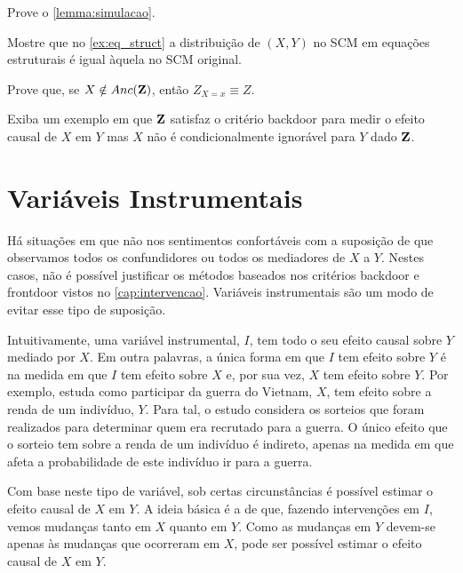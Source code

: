 \begin{exercise}
 Prove o \cref{lemma:simulacao}.
\end{exercise}

\begin{exercise}
 Mostre que no \cref{ex:eq_struct} 
 a distribuição de $(X,Y)$ no SCM 
 em equações estruturais é igual 
 àquela no SCM original.
\end{exercise}

\begin{exercise}
 \label{ex:pom_anc}
 Prove que, se $X \notin Anc({\mathbf{Z}})$, então
 $Z_{X=x} \equiv Z$.
\end{exercise}

\begin{exercise}
 Exiba um exemplo em que
 ${\mathbf{Z}}$ satisfaz o critério backdoor para
 medir o efeito causal de $X$ em $Y$ mas
 $X$ não é condicionalmente ignorável para $Y$ dado ${\mathbf{Z}}$.
\end{exercise}

\section{Variáveis Instrumentais}
\label{sec:instrument}

Há situações em que 
não nos sentimentos confortáveis com
a suposição de que observamos
todos os confundidores ou
todos os mediadores de $X$ a $Y$.
Nestes casos, não é possível
justificar os métodos baseados
nos critérios backdoor e frontdoor
vistos no \cref{cap:intervencao}.
Variáveis instrumentais são 
um modo de evitar esse tipo de suposição.

Intuitivamente, uma variável instrumental, $I$, tem
todo o seu efeito causal sobre $Y$ mediado por $X$.
Em outra palavras, a única forma em que $I$ tem
efeito sobre $Y$ é na medida em que 
$I$ tem efeito sobre $X$ e, por sua vez,
$X$ tem efeito sobre $Y$.
Por exemplo, \citet{Angrist1990} estuda
como participar da guerra do Vietnam, $X$, 
tem efeito sobre a renda de um indivíduo, $Y$.
Para tal, o estudo considera 
os sorteios que foram realizados para
determinar quem era recrutado para a guerra.
O único efeito que o sorteio tem
sobre a renda de um indivíduo é indireto,
apenas na medida em que afeta
a probabilidade de este indivíduo ir para a guerra.

Com base neste tipo de variável,
sob certas circunstâncias 
é possível estimar o efeito causal de $X$ em $Y$.
A ideia básica é a de que,
fazendo intervenções em $I$,
vemos mudanças tanto em $X$ quanto em $Y$.
Como as mudanças em $Y$ devem-se apenas 
às mudanças que ocorreram em $X$,
pode ser possível estimar o efeito causal de $X$ em $Y$.

